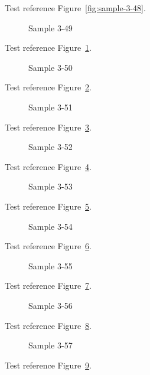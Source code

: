 Test reference Figure~\ref{fig:sample-3-48}.

\begin{figure}[tbhp]
\caption{Sample 3-49}
\label{fig:sample-3-49}
\end{figure}

Test reference Figure~\ref{fig:sample-3-49}.

\begin{figure}[tbhp]
\caption{Sample 3-50}
\label{fig:sample-3-50}
\end{figure}

Test reference Figure~\ref{fig:sample-3-50}.

\begin{figure}[tbhp]
\caption{Sample 3-51}
\label{fig:sample-3-51}
\end{figure}

Test reference Figure~\ref{fig:sample-3-51}.

\begin{figure}[tbhp]
\caption{Sample 3-52}
\label{fig:sample-3-52}
\end{figure}

Test reference Figure~\ref{fig:sample-3-52}.

\begin{figure}[tbhp]
\caption{Sample 3-53}
\label{fig:sample-3-53}
\end{figure}

Test reference Figure~\ref{fig:sample-3-53}.

\begin{figure}[tbhp]
\caption{Sample 3-54}
\label{fig:sample-3-54}
\end{figure}

Test reference Figure~\ref{fig:sample-3-54}.

\begin{figure}[tbhp]
\caption{Sample 3-55}
\label{fig:sample-3-55}
\end{figure}

Test reference Figure~\ref{fig:sample-3-55}.

\begin{figure}[tbhp]
\caption{Sample 3-56}
\label{fig:sample-3-56}
\end{figure}

Test reference Figure~\ref{fig:sample-3-56}.

\begin{figure}[tbhp]
\caption{Sample 3-57}
\label{fig:sample-3-57}
\end{figure}

Test reference Figure~\ref{fig:sample-3-57}.

